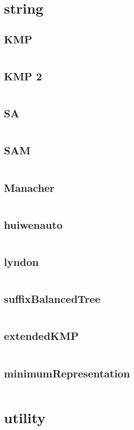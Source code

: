 \section{string}
  \subsection{KMP}
  \inputminted{cpp}{../code/string/KMP.cpp}
  \subsection{KMP 2}
    \inputminted{cpp}{../code/string/KMP_2.cpp}
  \subsection{SA}
  \inputminted{cpp}{../code/string/SA.cpp}
\subsection{SAM}
  \inputminted{cpp}{../code/string/SAM.cpp}
\subsection{Manacher}
  \inputminted{cpp}{../code/string/Manacher.cpp}
\subsection{huiwenauto}
  \inputminted{cpp}{../code/string/huiwenauto.cpp}
\subsection{lyndon}
  \inputminted{cpp}{../code/string/lyndon.cpp}
\subsection{suffixBalancedTree}
  \inputminted{cpp}{../code/string/suffixBalancedTree.cpp}
\subsection{extendedKMP}
  \inputminted{cpp}{../code/string/extendedKMP.cpp}
\subsection{minimumRepresentation}
  \inputminted{cpp}{../code/string/minimumRepresentation.cpp}
\section{utility}
